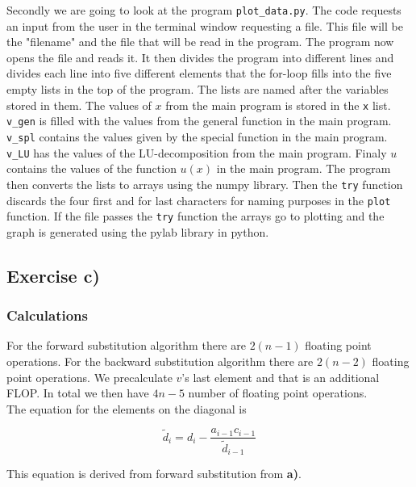 \documentclass{article}
\begin{document}
    Secondly we are going to look at the program \texttt{plot\_data.py}. The code requests an input from the user in the terminal window requesting a file. This file will be the "filename" and the file that will be read in the program. The program now opens the file and reads it. It then divides the program into different lines and divides each line into five different elements that the for-loop fills into the five empty lists in the top of the program. The lists are named after the variables stored in them. The values of $x$ from the main program is stored in the \texttt{x} list. \texttt{v\_gen} is filled with the values from the general function in the main program. \texttt{v\_spl} contains the values given by the special function in the main program. \texttt{v\_LU} has the values of the LU-decomposition from the main program. Finaly $u$ contains the values of the function $u(x)$ in the main program. The program then converts the lists to arrays using the numpy library. Then the \texttt{try} function discards the four first and for last characters for naming purposes in the \texttt{plot} function. If the file passes the \texttt{try} function the arrays go to plotting and the graph is generated using the pylab library in python.


\subsection{Exercise c)}

  \subsubsection{Calculations}

    For the forward substitution algorithm there are $2(n-1)$ floating point operations. For the backward substitution algorithm there are $2(n-2)$ floating point operations. We precalculate $v$'s last element and that is an additional FLOP. In total we then have $4n - 5$ number of floating point operations. \\

    The equation for the elements on the diagonal is

    \begin{equation*}
      \tilde{d}_i = d_i - \frac{a_{i-1} c_{i-1}}{\tilde{d}_{i-1}}
    \end{equation*}

    This equation is derived from forward substitution from \textbf{a)}. \\
\end{document}
